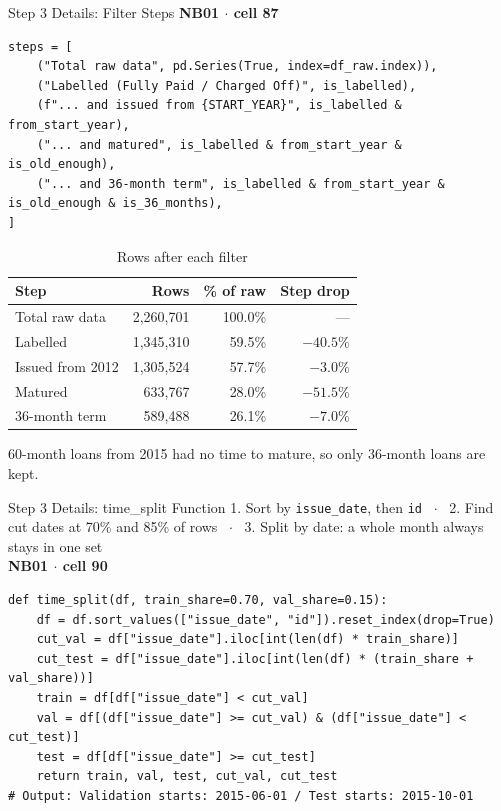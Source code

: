 \documentclass{beamer}
\newcommand{\code}[1]{\texttt{\small #1}}
\begin{document}
\begin{frame}[fragile]{Step 3 Details: Filter Steps}
  \textbf{\scriptsize NB01 $\cdot$ cell 87}
\begin{lstlisting}
steps = [
    ("Total raw data", pd.Series(True, index=df_raw.index)),
    ("Labelled (Fully Paid / Charged Off)", is_labelled),
    (f"... and issued from {START_YEAR}", is_labelled & from_start_year),
    ("... and matured", is_labelled & from_start_year & is_old_enough),
    ("... and 36-month term", is_labelled & from_start_year & is_old_enough & is_36_months),
]
\end{lstlisting}
  \begin{table}
    \centering
    \scriptsize
    \caption{Rows after each filter}
    \begin{tabular}{lrrr}
      \hline
      \textbf{Step} & \textbf{Rows} & \textbf{\% of raw} & \textbf{Step drop}\\
      \hline
      Total raw data & 2,260,701 & 100.0\% & ---\\
      Labelled & 1,345,310 & 59.5\% & $-40.5\%$\\
      Issued from 2012 & 1,305,524 & 57.7\% & $-3.0\%$\\
      Matured & 633,767 & 28.0\% & $-51.5\%$\\
      36-month term & 589,488 & 26.1\% & $-7.0\%$\\
      \hline
    \end{tabular}
  \end{table}
  60-month loans from 2015 had no time to mature, so only 36-month loans are kept.
\end{frame}

\begin{frame}[fragile]{Step 3 Details: time\_split Function}
  \scriptsize 1. Sort by \code{issue\_date}, then \code{id} \ $\cdot$ \ 2. Find cut dates at 70\% and 85\% of rows \ $\cdot$ \ 3. Split by date: a whole month always stays in one set\\[0.1cm]
  \textbf{NB01 $\cdot$ cell 90}
\begin{lstlisting}
def time_split(df, train_share=0.70, val_share=0.15):
    df = df.sort_values(["issue_date", "id"]).reset_index(drop=True)
    cut_val = df["issue_date"].iloc[int(len(df) * train_share)]
    cut_test = df["issue_date"].iloc[int(len(df) * (train_share + val_share))]
    train = df[df["issue_date"] < cut_val]
    val = df[(df["issue_date"] >= cut_val) & (df["issue_date"] < cut_test)]
    test = df[df["issue_date"] >= cut_test]
    return train, val, test, cut_val, cut_test
# Output: Validation starts: 2015-06-01 / Test starts: 2015-10-01
\end{lstlisting}
\end{frame}
\end{document}
